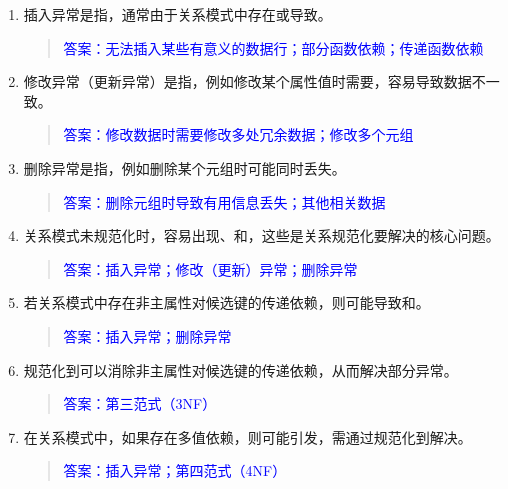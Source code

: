 \documentclass[a4paper,12pt,UTF8,fontset=none]{ctexart}
\begin{document}
\begin{enumerate}
    \item 插入异常是指\underline{\hspace{5cm}}，通常由于关系模式中存在\underline{\hspace{2cm}}或\underline{\hspace{2cm}}导致。
    \begin{quote}
        \textcolor{blue}{答案：无法插入某些有意义的数据行；部分函数依赖；传递函数依赖}
    \end{quote}

    \item 修改异常（更新异常）是指\underline{\hspace{5cm}}，例如修改某个属性值时需要\underline{\hspace{4cm}}，容易导致数据不一致。
    \begin{quote}
        \textcolor{blue}{答案：修改数据时需要修改多处冗余数据；修改多个元组}
    \end{quote}

    \item 删除异常是指\underline{\hspace{5cm}}，例如删除某个元组时可能同时丢失\underline{\hspace{4cm}}。
    \begin{quote}
        \textcolor{blue}{答案：删除元组时导致有用信息丢失；其他相关数据}
    \end{quote}

    \item 关系模式未规范化时，容易出现\underline{\hspace{2cm}}、\underline{\hspace{2cm}}和\underline{\hspace{2cm}}，这些是关系规范化要解决的核心问题。
    \begin{quote}
        \textcolor{blue}{答案：插入异常；修改（更新）异常；删除异常}
    \end{quote}

    \item 若关系模式中存在非主属性对候选键的传递依赖，则可能导致\underline{\hspace{2cm}}和\underline{\hspace{2cm}}。
    \begin{quote}
        \textcolor{blue}{答案：插入异常；删除异常}
    \end{quote}

    \item 规范化到\underline{\hspace{4cm}}可以消除非主属性对候选键的传递依赖，从而解决部分异常。
    \begin{quote}
        \textcolor{blue}{答案：第三范式（3NF）}
    \end{quote}

    \item 在关系模式中，如果存在多值依赖，则可能引发\underline{\hspace{3cm}}，需通过规范化到\underline{\hspace{3cm}}解决。
    \begin{quote}
        \textcolor{blue}{答案：插入异常；第四范式（4NF）}
    \end{quote}
\end{enumerate}
\end{document}
